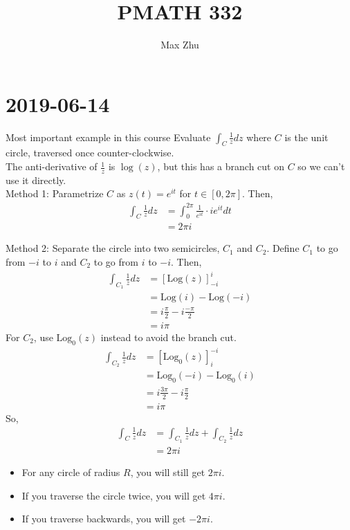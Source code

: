 \documentclass[12pt]{article}
\title{PMATH 332}
\author{Max Zhu}
\newcommand{\Log}{\text{Log}}
\begin{document}
	\maketitle
	\section{2019-06-14}	
	\begin{myex}{Most important example in this course}{}
		Evaluate $\int_C\frac{1}{z}dz$ where $C$ is the unit circle, traversed once counter-clockwise.\\
		
		The anti-derivative of $\frac{1}{z}$ is $\log(z)$, but this has a branch cut on $C$ so we can't use it directly.\\
		
		Method 1: Parametrize $C$ as $z(t)=e^{it}$ for $t\in[0, 2\pi]$. Then,
		\begin{align*}
			\int_C\frac{1}{z}dz&=\int_{0}^{2\pi}\frac{1}{e^{it}}\cdot ie^{it}dt\\
			&=2\pi i
		\end{align*}
		
		Method 2: Separate the circle into two semicircles, $C_1$ and $C_2$. Define $C_1$ to go from $-i$ to $i$ and $C_2$ to go from $i$ to $-i$. Then,
		\begin{align*}
			\int_{C_1}\frac{1}{z}dz&=[\Log(z)]_{-i}^{i}\\
			&=\Log(i)-\Log(-i)\\
			&=i\frac{\pi}{2}-i\frac{-\pi}{2}\\
			&=i\pi
		\end{align*}
		For $C_2$, use $\Log_0(z)$ instead to avoid the branch cut.
		\begin{align*}
			\int_{C_2}\frac{1}{z}dz&=[\Log_0(z)]_{i}^{-i}\\
			&=\Log_0(-i)-\Log_0(i)\\
			&=i\frac{3\pi}{2}-i\frac{\pi}{2}\\
			&=i\pi
		\end{align*}
		So,
		\begin{align*}
			\int_C\frac{1}{z}dz&=\int_{C_1}\frac{1}{z}dz+\int_{C_2}\frac{1}{z}dz\\
			&=2\pi i
		\end{align*}
	\end{myex}
	
	\begin{myrem}{}{}
		\begin{itemize}
			\item For any circle of radius $R$, you will still get $2\pi i$.
			\item If you traverse the circle twice, you will get $4\pi i$.
			\item If you traverse backwards, you will get $-2\pi i$.
		\end{itemize}
	\end{myrem}
	
\end{document}

